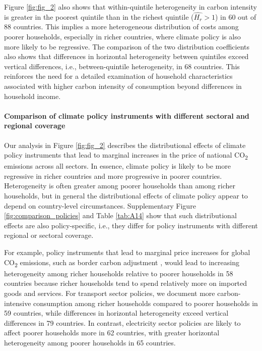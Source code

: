 \documentclass[12pt, a4paper]{article}
\begin{document}
Figure \ref{fig:fig_2} also shows that within-quintile heterogeneity in carbon intensity is greater in the poorest quintile than in the richest quintile ($\widehat{H_{r}}>1$) in 60 out of 88 countries. This implies a more heterogeneous distribution of costs among poorer households, especially in richer countries, where climate policy is also more likely to be regressive. The comparison of the two distribution coefficients also shows that differences in horizontal heterogeneity between quintiles exceed vertical differences, i.e., between-quintile heterogeneity, in 68 countries. This reinforces the need for a detailed examination of household characteristics associated with higher carbon intensity of consumption beyond differences in household income.

\paragraph{Comparison of climate policy instruments with different sectoral and regional coverage}

Our analysis in Figure \ref{fig:fig_2} describes the distributional effects of climate policy instruments that lead to marginal increases in the price of national CO\textsubscript{2} emissions across all sectors. In essence, climate policy is likely to be more regressive in richer countries and more progressive in poorer countries. Heterogeneity is often greater among poorer households than among richer households, but in general the distributional effects of climate policy appear to depend on country-level circumstances. Supplementary Figure \ref{fig:comparison_policies} and Table \ref{tab:A14} show that such distributional effects are also policy-specific, i.e., they differ for policy instruments with different regional or sectoral coverage.

For example, policy instruments that lead to marginal price increases for global CO\textsubscript{2} emissions, such as border carbon adjustment \autocite[e.g.,][]{Mehling.2019,Cosbey.2019}, would lead to increasing heterogeneity among richer households relative to poorer households in 58 countries because richer households tend to spend relatively more on imported goods and services. For transport sector policies, we document more carbon-intensive consumption among richer households compared to poorer households in 59 countries, while differences in horizontal heterogeneity exceed vertical differences in 79 countries. In contrast, electricity sector policies are likely to affect poorer households more in 62 countries, with greater horizontal heterogeneity among poorer households in 65 countries. 
\end{document}
